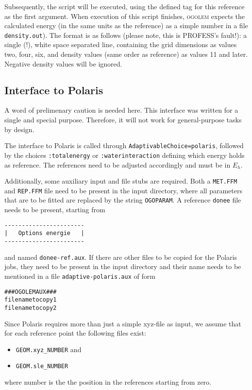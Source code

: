 \documentclass[a4paper,10pt]{scrbook}
\newcommand{\ogo}{\textsc{ogolem}}
\begin{document}
Subsequently, the script will be executed, using the defined tag for this reference as the first argument. When execution of
this script finishes, \ogo{} expects the calculated energy (in the same units as the reference) as
a simple number in a file \texttt{density.out}). The format is as follows (please note, this is PROFESS's fault!): a single (!), white space separated line, containing the grid dimensions as values two, four, six, and density values (same order as reference) as values 11 and later. Negative density values will be ignored.

\subsection{Interface to Polaris}
A word of prelimenary caution is needed here. This interface was written for a
single and special purpose. Therefore, it will not work for general-purpose
tasks by design.

The interface to Polaris is called through \texttt{AdaptivableChoice=polaris},
followed by the choices \texttt{:totalenergy} or \texttt{:waterinteraction}
defining which energy holds as reference. The references need to be adjusted
accordingly and must be in $E_h$.

Additionally, some auxiliary input and file stubs are required. Both a
\texttt{MET.FFM} and \texttt{REP.FFM} file need to be present in the input
directory, where all parameters that are to be fitted are replaced by the
string \texttt{OGOPARAM}. A reference \texttt{donee} file needs to be present,
starting from
\begin{verbatim}
-----------------------
|   Options energie   |
-----------------------
\end{verbatim}
and named \texttt{donee-ref.aux}. If there are other files to be copied for the
Polaris jobs, they need to be present in the input directory and their name
needs to be mentioned in a file \texttt{adaptive-polaris.aux} of form
\begin{verbatim}
###OGOLEMAUX###
filenametocopy1
filenametocopy2
\end{verbatim}

Since Polaris requires more than just a simple xyz-file as input, we assume that
for each reference point the following files exist:
\begin{itemize}
  \item \texttt{GEOM.xyz\_NUMBER} and
  \item \texttt{GEOM.sle\_NUMBER}
\end{itemize}
where number is the the position in the references starting from zero.
\end{document}
